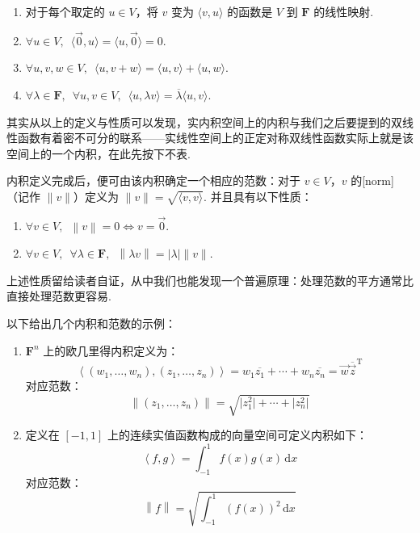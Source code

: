 \begin{enumerate}
    \item 对于每个取定的 $u \in V$，将 $ v $ 变为 $\langle v, u \rangle$ 的函数是 $ V $ 到 $\mathbf{F}$ 的线性映射.

    \item $\forall u \in V, \enspace \langle \vec{0}, u \rangle = \langle u, \vec{0} \rangle = 0$.

    \item $\forall u, v, w \in V, \enspace \langle u, v + w \rangle = \langle u, v \rangle + \langle u, w \rangle$.

    \item $\forall \lambda \in \mathbf{F}, \enspace \forall u, v \in V, \enspace \langle u, \lambda v \rangle = \overline{\lambda} \langle u, v \rangle$.
\end{enumerate}

其实从以上的定义与性质可以发现，实内积空间上的内积与我们之后要提到的双线性函数有着密不可分的联系——实线性空间上的正定对称双线性函数实际上就是该空间上的一个内积，在此先按下不表.

内积定义完成后，便可由该内积确定一个相应的范数：对于 $v \in V$，$v$ 的[norm]（记作 $ \lVert v \rVert $）定义为 $ \lVert v \rVert = \sqrt{\langle v, v \rangle}$. 并且具有以下性质：

\begin{enumerate}
    \item $\forall v \in V, \enspace \left\lVert v \right\rVert = 0 \iff v = \vec{0}$.

    \item $\forall v \in V, \enspace \forall \lambda \in \mathbf{F}, \enspace \left\lVert \lambda v \right\rVert  = \left\lvert \lambda \right\rvert \lVert v \rVert$.
\end{enumerate}

上述性质留给读者自证，从中我们也能发现一个普遍原理：处理范数的平方通常比直接处理范数更容易.

以下给出几个内积和范数的示例：

\begin{example} \label{ex:23:内积和范数}
    \begin{enumerate}
        \item $\mathbf{F}^{n}$ 上的欧几里得内积定义为：
              \[\left\langle (w_1, \ldots, w_n), (z_1, \ldots, z_n)\right\rangle = w_1\overline{z_1} + \cdots + w_n\overline{z_n} = \vec{w}\overline{\vec{z}}^{\mathrm{T}}\]
              对应范数：
              \[\left\lVert (z_1, \ldots, z_n) \right\rVert  = \sqrt{\lvert z^2_1 \rvert + \cdots + \lvert z^2_n \rvert}\]

        \item \label{item:23:内积和范数:2}
              定义在 $ \left[-1, 1\right] $ 上的连续实值函数构成的向量空间可定义内积如下：
              \[\left\langle f, g\right\rangle = \int_{-1}^1f(x)g(x)\,\mathrm{d}x\]
              对应范数：
              \[\left\lVert f \right\rVert = \sqrt{\int_{-1}^1(f(x))^2\,\mathrm{d}x}\]
    \end{enumerate}
\end{example}

